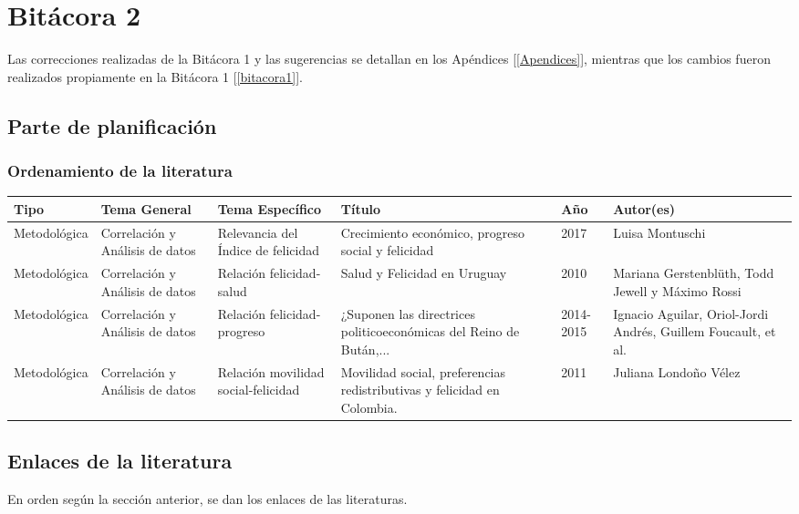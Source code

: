 \chapter{Bitácora 2} \label{bitacora2}
Las correcciones realizadas de la Bitácora 1 y las sugerencias se detallan en los Apéndices [\ref{Apendices}], mientras que los cambios fueron realizados propiamente en la Bitácora 1 [\ref{bitacora1}].
\section{Parte de planificación}

\subsection{Ordenamiento de la literatura}

\begin{table}[!h]
    \begin{center}
        \begin{tabular}{| m{2.5cm} | m{2.7cm} | m{3cm} | m{3cm} | m{1cm} | m{2.5cm} |}
        \hline\textbf{Tipo} & \textbf{Tema General} & \textbf{Tema Específico}& \textbf{Título} & \textbf{Año} & \textbf{Autor(es)}\\ \hline
        Metodológica & Correlación y Análisis de datos & Relevancia del Índice de felicidad & Crecimiento económico, progreso social y felicidad & 2017 & Luisa Montuschi\\ \hline
        Metodológica & Correlación y Análisis de datos & Relación felicidad-salud & Salud y Felicidad en Uruguay & 2010 & Mariana Gerstenblüth, Todd Jewell y Máximo Rossi \\ \hline
        Metodológica & Correlación y Análisis de datos &  Relación felicidad-progreso & ¿Suponen las directrices politicoeconómicas del Reino de Bután,... & 2014-2015 & Ignacio Aguilar, Oriol-Jordi Andrés, Guillem Foucault, et al.\\ \hline
        Metodológica & Correlación y Análisis de datos & Relación movilidad social-felicidad & Movilidad social, preferencias redistributivas y felicidad en Colombia. & 2011 & Juliana Londoño Vélez\\ \hline
        \end{tabular}
    \end{center}
\end{table}

\newpage
\section{Enlaces de la literatura}
En orden según la sección anterior, se dan los enlaces de las literaturas. \\

